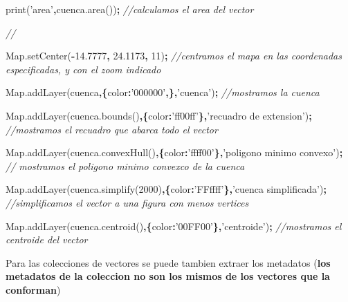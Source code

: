 \documentclass[
]{article}
\newenvironment{Shaded}{\begin{snugshade}}{\end{snugshade}}
\newcommand{\AttributeTok}[1]{\textcolor[rgb]{0.77,0.63,0.00}{#1}}
\newcommand{\CommentTok}[1]{\textcolor[rgb]{0.56,0.35,0.01}{\textit{#1}}}
\newcommand{\DataTypeTok}[1]{\textcolor[rgb]{0.13,0.29,0.53}{#1}}
\newcommand{\DecValTok}[1]{\textcolor[rgb]{0.00,0.00,0.81}{#1}}
\newcommand{\FloatTok}[1]{\textcolor[rgb]{0.00,0.00,0.81}{#1}}
\newcommand{\NormalTok}[1]{#1}
\newcommand{\OperatorTok}[1]{\textcolor[rgb]{0.81,0.36,0.00}{\textbf{#1}}}
\newcommand{\StringTok}[1]{\textcolor[rgb]{0.31,0.60,0.02}{#1}}
\newcommand{\VariableTok}[1]{\textcolor[rgb]{0.00,0.00,0.00}{#1}}
\begin{document}
\begin{Shaded}
\begin{Highlighting}[]
\AttributeTok{print}\NormalTok{(}\StringTok{'area'}\OperatorTok{,}\VariableTok{cuenca}\NormalTok{.}\AttributeTok{area}\NormalTok{())}\OperatorTok{;} \CommentTok{//calculamos el area del vector}

\CommentTok{//}

\VariableTok{Map}\NormalTok{.}\AttributeTok{setCenter}\NormalTok{(}\OperatorTok{-}\FloatTok{14.7777}\OperatorTok{,} \FloatTok{24.1173}\OperatorTok{,} \DecValTok{11}\NormalTok{)}\OperatorTok{;}  \CommentTok{//centramos el mapa en las coordenadas especificadas, y con el zoom indicado}

\VariableTok{Map}\NormalTok{.}\AttributeTok{addLayer}\NormalTok{(cuenca}\OperatorTok{,\{}\DataTypeTok{color}\OperatorTok{:}\StringTok{'000000'}\OperatorTok{,\},}\StringTok{'cuenca'}\NormalTok{)}\OperatorTok{;} \CommentTok{//mostramos la cuenca}

\VariableTok{Map}\NormalTok{.}\AttributeTok{addLayer}\NormalTok{(}\VariableTok{cuenca}\NormalTok{.}\AttributeTok{bounds}\NormalTok{()}\OperatorTok{,\{}\DataTypeTok{color}\OperatorTok{:}\StringTok{'ff00ff'}\OperatorTok{\},}\StringTok{'recuadro de extension'}\NormalTok{)}\OperatorTok{;} \CommentTok{//mostramos el recuadro que abarca todo el vector}

\VariableTok{Map}\NormalTok{.}\AttributeTok{addLayer}\NormalTok{(}\VariableTok{cuenca}\NormalTok{.}\AttributeTok{convexHull}\NormalTok{()}\OperatorTok{,\{}\DataTypeTok{color}\OperatorTok{:}\StringTok{'ffff00'}\OperatorTok{\},}\StringTok{'poligono minimo convexo'}\NormalTok{)}\OperatorTok{;} \CommentTok{// mostramos el poligono minimo convexco de la cuenca}

\VariableTok{Map}\NormalTok{.}\AttributeTok{addLayer}\NormalTok{(}\VariableTok{cuenca}\NormalTok{.}\AttributeTok{simplify}\NormalTok{(}\DecValTok{2000}\NormalTok{)}\OperatorTok{,\{}\DataTypeTok{color}\OperatorTok{:}\StringTok{'FFffff'}\OperatorTok{\},}\StringTok{'cuenca simplificada'}\NormalTok{)}\OperatorTok{;} \CommentTok{//simplificamos el vector a una figura con menos vertices}

\VariableTok{Map}\NormalTok{.}\AttributeTok{addLayer}\NormalTok{(}\VariableTok{cuenca}\NormalTok{.}\AttributeTok{centroid}\NormalTok{()}\OperatorTok{,\{}\DataTypeTok{color}\OperatorTok{:}\StringTok{'00FF00'}\OperatorTok{\},}\StringTok{'centroide'}\NormalTok{)}\OperatorTok{;} \CommentTok{//mostramos el centroide del vector}
\end{Highlighting}
\end{Shaded}

Para las colecciones de vectores se puede tambien extraer los metadatos
(\textbf{los metadatos de la coleccion no son los mismos de los vectores
que la conforman})
\end{document}
